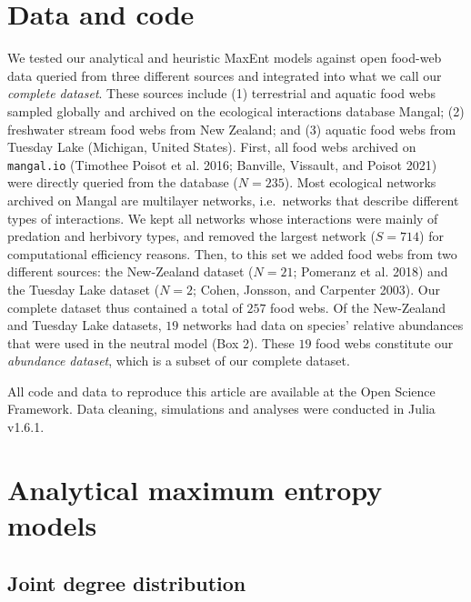\documentclass[10pt,oneside]{article}
\begin{document}
\hypertarget{data-and-code}{%
\section{Data and code}\label{data-and-code}}

We tested our analytical and heuristic MaxEnt models against open
food-web data queried from three different sources and integrated into
what we call our \emph{complete dataset}. These sources include (1)
terrestrial and aquatic food webs sampled globally and archived on the
ecological interactions database Mangal; (2) freshwater stream food webs
from New Zealand; and (3) aquatic food webs from Tuesday Lake (Michigan,
United States). First, all food webs archived on \texttt{mangal.io}
(Timothee Poisot et al. 2016; Banville, Vissault, and Poisot 2021) were
directly queried from the database (\(N = 235\)). Most ecological
networks archived on Mangal are multilayer networks, i.e.~networks that
describe different types of interactions. We kept all networks whose
interactions were mainly of predation and herbivory types, and removed
the largest network (\(S = 714\)) for computational efficiency reasons.
Then, to this set we added food webs from two different sources: the
New-Zealand dataset (\(N = 21\); Pomeranz et al. 2018) and the Tuesday
Lake dataset (\(N = 2\); Cohen, Jonsson, and Carpenter 2003). Our
complete dataset thus contained a total of \(257\) food webs. Of the
New-Zealand and Tuesday Lake datasets, \(19\) networks had data on
species' relative abundances that were used in the neutral model (Box
2). These \(19\) food webs constitute our \emph{abundance dataset},
which is a subset of our complete dataset.

All code and data to reproduce this article are available at the Open
Science Framework. Data cleaning, simulations and analyses were
conducted in Julia v1.6.1.

\hypertarget{analytical-maximum-entropy-models}{%
\section{Analytical maximum entropy
models}\label{analytical-maximum-entropy-models}}

\hypertarget{joint-degree-distribution}{%
\subsection{Joint degree distribution}\label{joint-degree-distribution}}
\end{document}
